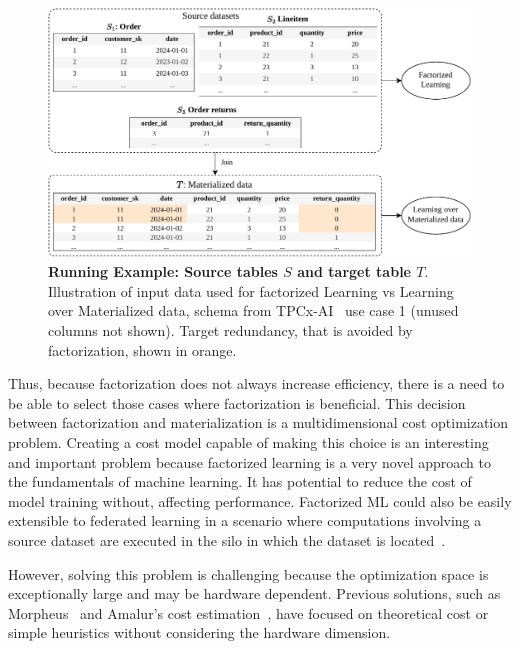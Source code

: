 \begin{figure}[ht]
  \centering
  \includegraphics[width=0.95\linewidth]{chapters/01_introduction/figures/running-example-intro.pdf}
  \caption[Running Example: Source tables $S$ and target table $T$]{\textbf{Running Example: Source tables $S$ and target table $T$}. \\ Illustration of input data used for factorized Learning vs Learning over Materialized data, schema from TPCx-AI~\cite{tpcx-ai} use case 1 (unused columns not shown). Target redundancy, that is avoided by factorization, shown in orange.}
  \label{fig:running-example-fac-vs-mat}
\end{figure}

Thus, because factorization does not always increase efficiency, there is a need to be able to select those cases where factorization is beneficial. This decision between factorization and materialization is a multidimensional cost optimization problem. Creating a cost model capable of making this choice is an interesting and important problem because factorized learning is a very novel approach to the fundamentals of machine learning. It has potential to reduce the cost of model training without, affecting performance. Factorized ML could also be easily extensible to federated learning in a scenario where computations involving a source dataset are executed in the silo in which the dataset is located~\cite{amalur}.

However, solving this problem is challenging because the optimization space is exceptionally large and may be hardware dependent. Previous solutions, such as Morpheus~\cite{morpheus} and Amalur's cost estimation~\cite{amalur_tkde24}, have focused on theoretical cost or simple heuristics without considering the hardware dimension.

